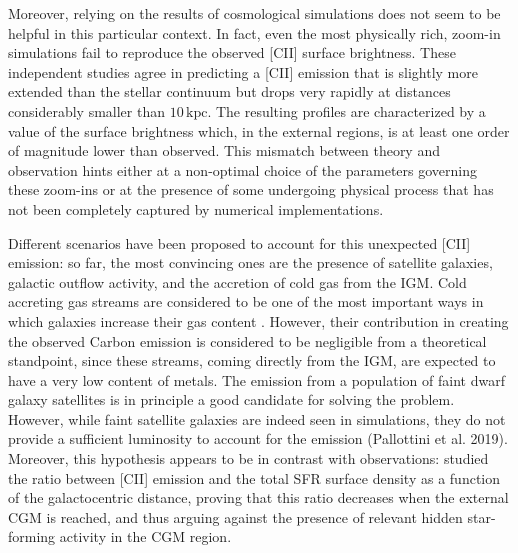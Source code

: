 \documentclass[12pt]{article}
\begin{document}
Moreover, relying on the results of cosmological simulations does not seem to be helpful in this particular context. In fact, even the most physically rich, zoom-in simulations \citep{pallottini2017b, Arata:2019} fail to reproduce the observed [CII] surface brightness. These independent studies agree in predicting a [CII] emission that is slightly more extended than the stellar continuum but drops very rapidly at distances considerably smaller than $10\,\mathrm{kpc}$. The resulting profiles are characterized by a value of the surface brightness which, in the external regions, is at least one order of magnitude lower than observed. This mismatch between theory and observation hints either at a non-optimal choice of the parameters governing these zoom-ins or at the presence of some undergoing physical process that has not been completely captured by numerical implementations. 

Different scenarios have been proposed to account for this unexpected [CII] emission: so far, the most convincing ones are the presence of satellite galaxies, galactic outflow activity, and the accretion of cold gas from the IGM. Cold accreting gas streams are considered to be one of the most important ways in which galaxies increase their gas content \citep[e.g.][]{Sancisi:2008wf}. However, their contribution in creating the observed Carbon emission is considered to be negligible from a theoretical standpoint, since these streams, coming directly from the IGM, are expected to have a very low content of metals.
The emission from a population of faint dwarf galaxy satellites is in principle a good candidate for solving the problem. However, while faint satellite galaxies are indeed seen in simulations, they do not provide a sufficient luminosity to account for the emission (Pallottini et al. 2019). Moreover, this hypothesis appears to be in contrast with observations: \citet{Fujimoto19} studied the ratio between [CII] emission and the total SFR surface density as a function of the galactocentric distance, proving that this ratio decreases when the external CGM is reached, and thus arguing against the presence of relevant hidden star-forming activity in the CGM region.
\end{document}
